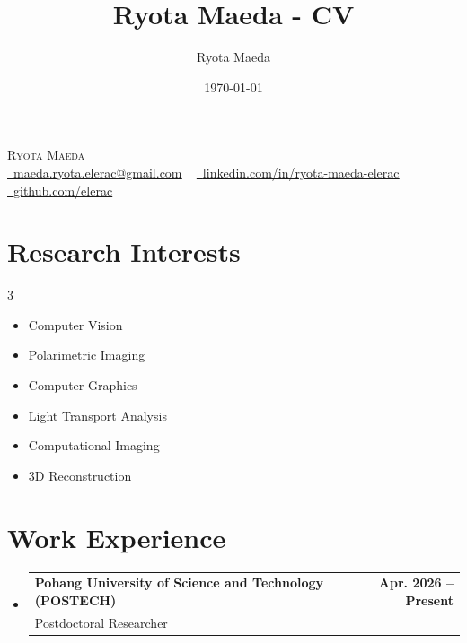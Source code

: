 \documentclass[letterpaper,11pt]{article}
\title{Ryota Maeda - CV}
\author{Ryota Maeda}
\date{\today}
\makeatletter
\newcommand{\resumeSubheading}[3]{
  \vspace{-2pt}\item
    \begin{tabular*}{1.0\textwidth}[t]{l@{\extracolsep{\fill}}r}
      \textbf{#1} & \textbf{\small #2} \\
      {\small#3} &  \\
    \end{tabular*}\vspace{-7pt}
}
\newcommand{\resumeSubHeadingListStart}{\begin{itemize}[leftmargin=0.0in, label={}]}
\newcommand{\resumeSubHeadingListEnd}{\end{itemize}}
\makeatother
\begin{document}

\begin{center}
    {\Huge \scshape Ryota Maeda} \\ \vspace{1pt}
    \small \href{mailto:maeda.ryota.elerac@gmail.com}{\raisebox{-0.2\height}\faEnvelope\  \underline{maeda.ryota.elerac@gmail.com}} ~ 
    \href{https://www.linkedin.com/in/ryota-maeda-elerac/}{\raisebox{-0.2\height}\faLinkedin\ \underline{linkedin.com/in/ryota-maeda-elerac}}  ~
    \href{https://github.com/elerac}{\raisebox{-0.2\height}\faGithub\ \underline{github.com/elerac}}
    \vspace{-8pt}
\end{center}

\section{Research Interests}
    \begin{multicols}{3}
        \begin{itemize}[itemsep=-5pt, parsep=3pt]
            \item\small Computer Vision
            \item Polarimetric Imaging
            \item Computer Graphics
            \item Light Transport Analysis
            \item Computational Imaging
            \item 3D Reconstruction
        \end{itemize}
    \end{multicols}
    \vspace*{2.0\multicolsep}

\section{Work Experience}
  \resumeSubHeadingListStart
    \resumeSubheading
      {Pohang University of Science and Technology (POSTECH)}{Apr. 2026 -- Present}
      {Postdoctoral Researcher}
  \resumeSubHeadingListEnd
\end{document}

